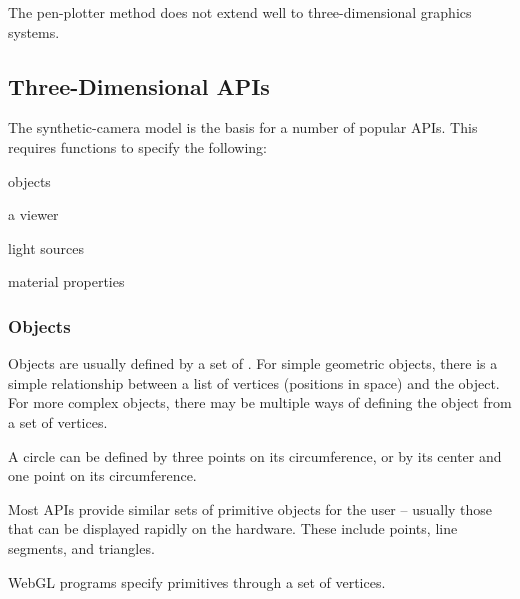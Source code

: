 \documentclass[../COS3712_Notes.tex]{subfiles}
\begin{document}
        The pen-plotter method does not extend well to three-dimensional graphics systems.

      \subsection{Three-Dimensional APIs}
        The synthetic-camera model is the basis for a number of popular APIs.
        This requires functions to specify the following:
        \begin{center}
          \begin{itemize*}[itemjoin=\quad]
            \item objects
            \item a viewer
            \item light sources
            \item material properties
          \end{itemize*}
        \end{center}

        \subsubsection{Objects}
          Objects are usually defined by a set of .
          For simple geometric objects, there is a simple relationship between a list of vertices
          (positions in space)
          and the object.
          For more complex objects, there may be multiple ways of defining the object
          from a set of vertices.

          \begin{example}[Circle]
            A circle can be defined by three points on its circumference,
            or by its center and one point on its circumference.
          \end{example}

          Most APIs provide similar sets of primitive objects for the user
          -- usually those that can be displayed rapidly on the hardware.
          These include points, line segments, and triangles.

          WebGL programs specify primitives through a set of vertices.
\end{document}
